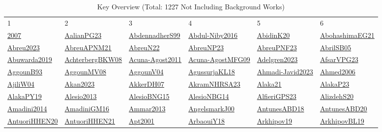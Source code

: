\begin{longtable}{*{6}{l}}
\rowcolor{white}\caption{Key Overview (Total: 1227 Not Including Background Works)}\\ \toprule
\rowcolor{white}1 & 2 & 3 & 4 & 5 & 6\\ \midrule
\endhead
\bottomrule
\endfoot
\hyperref[detail:2007]{2007} & \hyperref[detail:AalianPG23]{AalianPG23} & \hyperref[detail:AbdennadherS99]{AbdennadherS99} & \hyperref[detail:Abdul-Niby2016]{Abdul-Niby2016} & \hyperref[detail:AbidinK20]{AbidinK20} & \hyperref[detail:AbohashimaEG21]{AbohashimaEG21}\\ 
\hyperref[detail:Abreu2023]{Abreu2023} & \hyperref[detail:AbreuAPNM21]{AbreuAPNM21} & \hyperref[detail:AbreuN22]{AbreuN22} & \hyperref[detail:AbreuNP23]{AbreuNP23} & \hyperref[detail:AbreuPNF23]{AbreuPNF23} & \hyperref[detail:AbrilSB05]{AbrilSB05}\\ 
\hyperref[detail:Abuwarda2019]{Abuwarda2019} & \hyperref[detail:AchterbergBKW08]{AchterbergBKW08} & \hyperref[detail:Acuna-Agost2011]{Acuna-Agost2011} & \hyperref[detail:Acuna-AgostMFG09]{Acuna-AgostMFG09} & \hyperref[detail:Adelgren2023]{Adelgren2023} & \hyperref[detail:AfsarVPG23]{AfsarVPG23}\\ 
\hyperref[detail:AggounB93]{AggounB93} & \hyperref[detail:AggounMV08]{AggounMV08} & \hyperref[detail:AggounV04]{AggounV04} & \hyperref[detail:AgussurjaKL18]{AgussurjaKL18} & \hyperref[detail:Ahmadi-Javid2023]{Ahmadi-Javid2023} & \hyperref[detail:Ahmed2006]{Ahmed2006}\\ 
\hyperref[detail:AjiliW04]{AjiliW04} & \hyperref[detail:Akan2023]{Akan2023} & \hyperref[detail:AkkerDH07]{AkkerDH07} & \hyperref[detail:AkramNHRSA23]{AkramNHRSA23} & \hyperref[detail:Alaka21]{Alaka21} & \hyperref[detail:AlakaP23]{AlakaP23}\\ 
\hyperref[detail:AlakaPY19]{AlakaPY19} & \hyperref[detail:Alesio2013]{Alesio2013} & \hyperref[detail:AlesioBNG15]{AlesioBNG15} & \hyperref[detail:AlesioNBG14]{AlesioNBG14} & \hyperref[detail:AlfieriGPS23]{AlfieriGPS23} & \hyperref[detail:AlizdehS20]{AlizdehS20}\\ 
\hyperref[detail:Amadini2014]{Amadini2014} & \hyperref[detail:AmadiniGM16]{AmadiniGM16} & \hyperref[detail:Ammar2013]{Ammar2013} & \hyperref[detail:AngelsmarkJ00]{AngelsmarkJ00} & \hyperref[detail:AntunesABD18]{AntunesABD18} & \hyperref[detail:AntunesABD20]{AntunesABD20}\\ 
\hyperref[detail:AntuoriHHEN20]{AntuoriHHEN20} & \hyperref[detail:AntuoriHHEN21]{AntuoriHHEN21} & \hyperref[detail:Apt2001]{Apt2001} & \hyperref[detail:ArbaouiY18]{ArbaouiY18} & \hyperref[detail:Arkhipov19]{Arkhipov19} & \hyperref[detail:ArkhipovBL19]{ArkhipovBL19}\\ 

\end{longtable}
